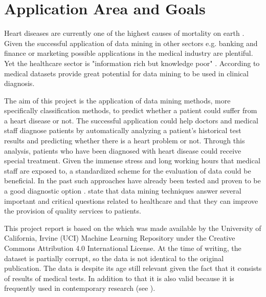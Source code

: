 \section{Application Area and Goals} \label{sec:applicationAreaGoals}

Heart diseases are currently one of the highest causes of mortality on earth \citep{nahar2013, kavitha2016, statistischesbundesamt2020}.
Given the successful application of data mining in other sectors e.g. banking and finance or marketing \citep{keles2017} possible applications in the medical industry are plentiful. Yet the healthcare sector is "information rich but knowledge poor" \citep{soni2011}. According to \citet{soni2011} medical datasets provide great potential for data mining to be used in clinical diagnosis.


The aim of this project is the application of data mining methods, more specifically classification methods, to predict whether a patient could suffer from a heart disease or not. The successful application could help doctors and medical staff diagnose patients by automatically analyzing a patient's historical test results and predicting whether there is a heart problem or not. Through this analysis, patients who have been diagnosed with heart disease could receive special treatment. Given the immense stress and long working hours that medical staff are exposed to, a standardized scheme for the evaluation of data could be beneficial. 
In the past such approaches have already been tested and proven to be a good diagnostic option \citep{usharani2011}. \citet{jabbar2013} state that data mining techniques answer several important and critical questions related to healthcare and that they can improve the provision of quality services to patients.

This project report is based on the  \citep{janosi1988} which was made available by the University of California, Irvine (UCI) Machine Learning Repository under the Creative Commons Attribution 4.0 International License. At the time of writing, the dataset is partially corrupt, so the data is not identical to the original publication. The data is despite its age still relevant given the fact that it consists of results of medical tests. In addition to that it is also valid because it is frequently used in contemporary research (see \cite{usharani2011, aha1988, nahar2013}). 